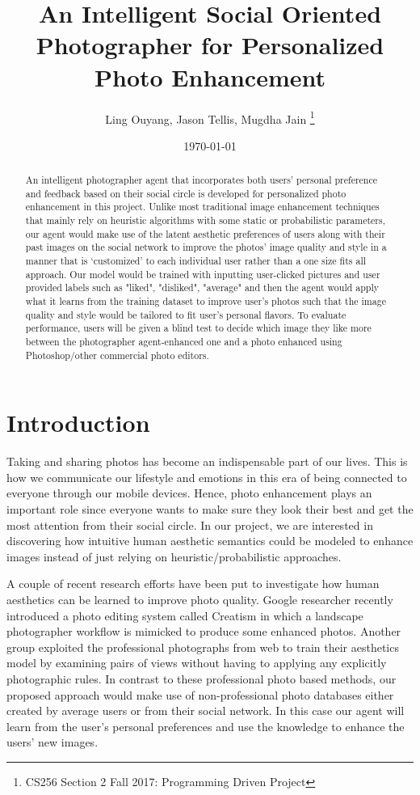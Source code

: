 \documentclass[11pt, a4paper, twocolumn]{article}
\title{An Intelligent Social Oriented Photographer for Personalized Photo Enhancement }
\author{Ling Ouyang, Jason Tellis, Mugdha Jain	
\thanks{CS256 Section 2 Fall 2017: Programming Driven Project}}
\date{\today}
\begin{document}
\maketitle

\begin{abstract}
An intelligent photographer agent that incorporates both users' personal preference and feedback based on their social circle is developed for personalized photo enhancement in this project. Unlike most traditional image enhancement techniques that mainly rely on heuristic algorithms with some static or probabilistic parameters, our agent would make use of the latent aesthetic preferences of users along with their past images on the social network to improve the photos' image quality and style in a manner that is ‘customized’ to each individual user rather than a one size fits all approach. Our model would be trained with inputting user-clicked pictures and user provided labels such as "liked", "disliked", "average" and then the agent would apply what it learns from the training dataset to improve user's photos such that the image quality and style would be tailored to fit user's personal flavors.     
 To evaluate performance, users will be given a blind test to decide which image they like more between the photographer agent-enhanced one and a photo enhanced using Photoshop/other commercial photo editors.\end{abstract}

\section{Introduction}

Taking and sharing photos has become an indispensable part of our lives. This is how we communicate our lifestyle and emotions in this era of being connected to everyone through our mobile devices. Hence, photo enhancement plays an important role since everyone wants to make sure they look their best and get the most attention from their social circle. In our project, we are interested in discovering how intuitive human aesthetic semantics could be modeled to enhance images instead of just relying on heuristic/probabilistic approaches.  

A couple of recent research efforts have been put to investigate how human aesthetics can be learned to improve photo quality. Google researcher \cite{DBLP:journals/corr/FangZ17} recently introduced a photo editing system called Creatism in which a landscape photographer workflow is mimicked to produce some enhanced photos. Another group \cite{DBLP:journals/corr/ChenKSCM17} exploited the professional photographs from web to train their aesthetics model by examining pairs of views without having to applying any explicitly photographic rules. In contrast to these professional photo based methods, 
our proposed approach would make use of non-professional photo databases either created by average users or from their social network. In this case our agent will learn from the user’s personal preferences and use the knowledge to enhance the users' new images.
\end{document}
